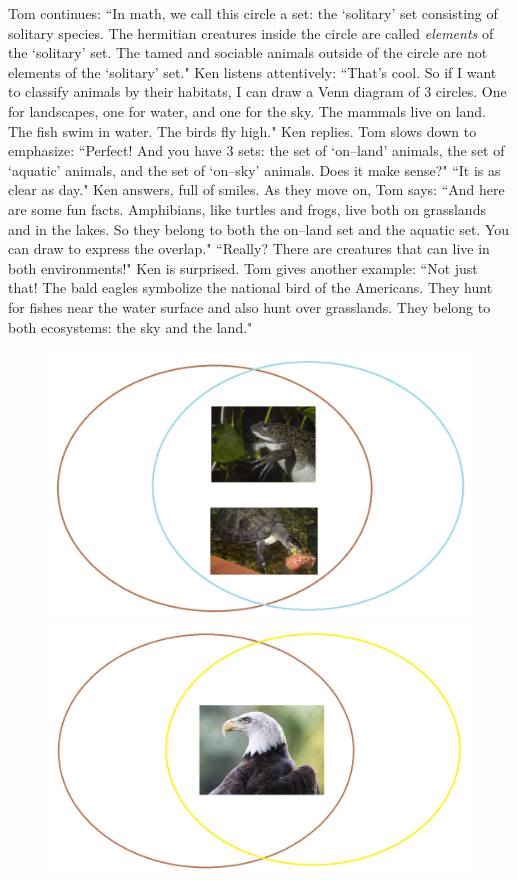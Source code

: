 \begin{multicols}{2}
	Tom continues: ``In math, we call this circle a set: the `solitary' set consisting of solitary species. The hermitian creatures inside the circle are called \textit{elements} of the `solitary' set. The tamed and sociable animals outside of the circle are not elements of the `solitary' set."
	\vskip 0.1cm
	Ken listens attentively: ``That's cool. So if I want to classify animals by their habitats, I can draw a Venn diagram of $3$ circles. One for landscapes, one for water, and one for the sky. The mammals live on land. The fish swim in water. The birds fly high." Ken replies.
	\vskip 0.1cm
	Tom slows down to emphasize: ``Perfect! And you have $3$ sets: the set of `on--land' animals, the set of `aquatic' animals, and the set of `on--sky' animals. Does it make sense?"
	\vskip 0.1cm
	``It is as clear as day." Ken answers, full of smiles.
	\vskip 0.1cm
	As they move on, Tom says: ``And here are some fun facts. Amphibians, like turtles and frogs, live both on grasslands and in the lakes. So they belong to both the on--land set and the aquatic set. You can draw to express the overlap." 
	\vskip 0.1cm
	``Really? There are creatures that can live in both environments!" Ken is surprised.
	\vskip 0.1cm
	Tom gives another example: ``Not just that! The bald eagles symbolize the national bird of the Americans. They hunt for fishes near the water surface and also hunt over grasslands. They belong to both ecosystems: the sky and the land."
	\begin{figure}[H]
			\vspace*{-10pt}
			\centering
			\captionsetup{labelformat= empty, justification=centering}
			\includegraphics[height= 0.3\linewidth]{p2}
			\includegraphics[height= 0.3\linewidth]{p3}
			\vspace*{-25pt}

\end{figure}
\end{multicols}
